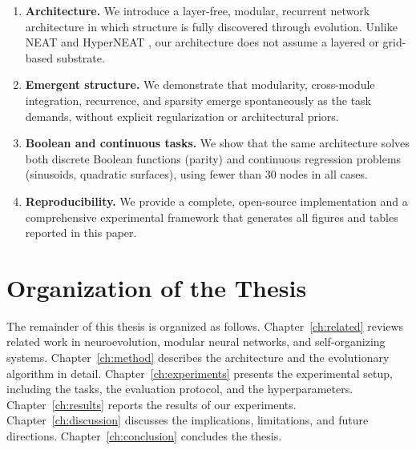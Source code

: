 \begin{enumerate}
  \item \textbf{Architecture.} We introduce a layer-free, modular,
    recurrent network architecture in which structure is fully
    discovered through evolution. Unlike NEAT \citep{stanley2002evolving}
    and HyperNEAT \citep{stanley2009hypercube}, our architecture does
    not assume a layered or grid-based substrate.
  \item \textbf{Emergent structure.} We demonstrate that modularity,
    cross-module integration, recurrence, and sparsity emerge
    spontaneously as the task demands, without explicit regularization
    or architectural priors.
  \item \textbf{Boolean and continuous tasks.} We show that the same
    architecture solves both discrete Boolean functions (parity) and
    continuous regression problems (sinusoids, quadratic surfaces),
    using fewer than 30 nodes in all cases.
  \item \textbf{Reproducibility.} We provide a complete, open-source
    implementation and a comprehensive experimental framework that
    generates all figures and tables reported in this paper.
\end{enumerate}

\section{Organization of the Thesis}

The remainder of this thesis is organized as follows.
Chapter~\ref{ch:related} reviews related work in neuroevolution,
modular neural networks, and self-organizing systems.
Chapter~\ref{ch:method} describes the \modnet{} architecture and the
evolutionary algorithm in detail.
Chapter~\ref{ch:experiments} presents the experimental setup, including
the tasks, the evaluation protocol, and the hyperparameters.
Chapter~\ref{ch:results} reports the results of our experiments.
Chapter~\ref{ch:discussion} discusses the implications, limitations, and
future directions.
Chapter~\ref{ch:conclusion} concludes the thesis.